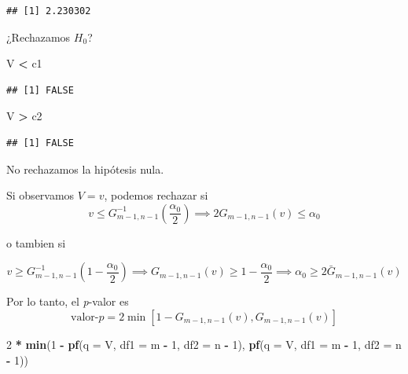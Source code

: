 \documentclass[
  12pt,
]{book}
\newenvironment{Shaded}{\begin{snugshade}}{\end{snugshade}}
\newcommand{\DataTypeTok}[1]{\textcolor[rgb]{0.13,0.29,0.53}{#1}}
\newcommand{\DecValTok}[1]{\textcolor[rgb]{0.00,0.00,0.81}{#1}}
\newcommand{\KeywordTok}[1]{\textcolor[rgb]{0.13,0.29,0.53}{\textbf{#1}}}
\newcommand{\NormalTok}[1]{#1}
\newcommand{\OperatorTok}[1]{\textcolor[rgb]{0.81,0.36,0.00}{\textbf{#1}}}
\newcommand{\StringTok}[1]{\textcolor[rgb]{0.31,0.60,0.02}{#1}}
\begin{document}
\begin{verbatim}
## [1] 2.230302
\end{verbatim}

¿Rechazamos \(H_0\)?

\begin{Shaded}
\begin{Highlighting}[]
\NormalTok{V }\OperatorTok{\textless{}}\StringTok{ }\NormalTok{c1}
\end{Highlighting}
\end{Shaded}

\begin{verbatim}
## [1] FALSE
\end{verbatim}

\begin{Shaded}
\begin{Highlighting}[]
\NormalTok{V }\OperatorTok{\textgreater{}}\StringTok{ }\NormalTok{c2}
\end{Highlighting}
\end{Shaded}

\begin{verbatim}
## [1] FALSE
\end{verbatim}

No rechazamos la hipótesis nula.

Si observamos \(V=v\), podemos rechazar si\\
\[
v\leq G^{-1}_{m-1,n-1}\left(\dfrac{\alpha_0}2\right) \implies 2G_{m-1,n-1}(v)\leq \alpha_0
\]

o tambien si

\[v\geq G^{-1}_{m-1,n-1}\left(1-\dfrac{\alpha_0}2 \right) \implies G_{m-1,n-1}(v) \geq 1-\dfrac{\alpha_0}2 \implies \alpha_0\geq 2\bar G_{m-1,n-1}(v) \]

Por lo tanto, el \emph{p}-valor es
\[\text{valor-}p = 2\min[1-G_{m-1,n-1}(v), G_{m-1,n-1}(v)]\]

\begin{Shaded}
\begin{Highlighting}[]
\DecValTok{2} \OperatorTok{*}\StringTok{ }\KeywordTok{min}\NormalTok{(}\DecValTok{1} \OperatorTok{{-}}\StringTok{ }\KeywordTok{pf}\NormalTok{(}\DataTypeTok{q =}\NormalTok{ V, }\DataTypeTok{df1 =}\NormalTok{ m }\OperatorTok{{-}}\StringTok{ }\DecValTok{1}\NormalTok{, }\DataTypeTok{df2 =}\NormalTok{ n }\OperatorTok{{-}}\StringTok{ }\DecValTok{1}\NormalTok{),}
  \KeywordTok{pf}\NormalTok{(}\DataTypeTok{q =}\NormalTok{ V, }\DataTypeTok{df1 =}\NormalTok{ m }\OperatorTok{{-}}\StringTok{ }\DecValTok{1}\NormalTok{, }\DataTypeTok{df2 =}\NormalTok{ n }\OperatorTok{{-}}\StringTok{ }\DecValTok{1}\NormalTok{))}
\end{Highlighting}
\end{Shaded}
\end{document}
